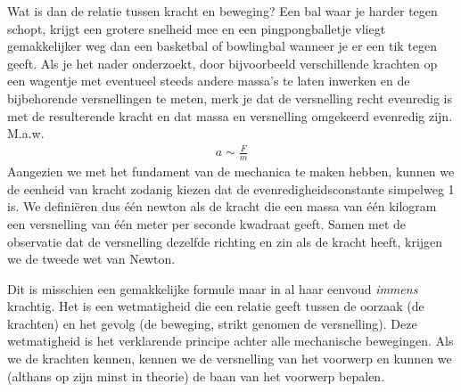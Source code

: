 Wat is dan de relatie tussen kracht en beweging? Een bal waar je harder tegen schopt, krijgt een grotere snelheid mee en een pingpongballetje vliegt gemakkelijker weg dan een basketbal of bowlingbal wanneer je er een tik tegen geeft. Als je het nader onderzoekt, door bijvoorbeeld verschillende krachten op een wagentje met eventueel steeds andere massa's te laten inwerken en de bijbehorende versnellingen te meten, merk je dat de versnelling recht evenredig is met de resulterende kracht en dat massa en versnelling omgekeerd evenredig zijn. M.a.w.
\begin{eqnarray*}
a\sim\frac{F}{m}
\end{eqnarray*}
Aangezien we met het fundament van de mechanica te maken hebben, kunnen we de eenheid van kracht zodanig kiezen dat de evenredigheidsconstante simpelweg 1 is. We defini\"eren dus \'e\'en newton als de kracht die een massa van \'e\'en kilogram een versnelling van \'e\'en meter per seconde kwadraat geeft. Samen met de observatie dat de versnelling dezelfde richting en zin als de kracht heeft, krijgen we de tweede wet van Newton.
\newline
{}

Dit is misschien een gemakkelijke formule maar in al haar eenvoud \emph{immens} krachtig. Het is een wetmatigheid die een relatie geeft tussen de oorzaak (de krachten) en het gevolg (de beweging, strikt genomen de versnelling). Deze wetmatigheid is het verklarende principe achter alle mechanische bewegingen. Als we de krachten kennen, kennen we de versnelling van het voorwerp en kunnen we (althans op zijn minst in theorie) de baan van het voorwerp bepalen.


